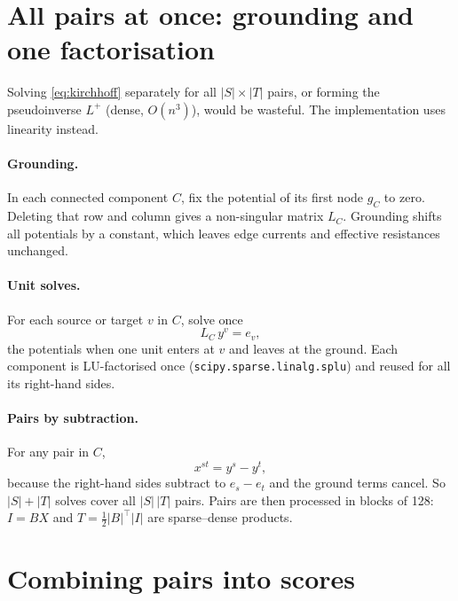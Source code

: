 \documentclass[11pt]{article}
\newcommand{\code}[1]{\texttt{#1}}
\begin{document}
\section{All pairs at once: grounding and one factorisation}

Solving \eqref{eq:kirchhoff} separately for all $|S|\times|T|$ pairs, or forming the
pseudoinverse $L^{+}$ (dense, $O(n^3)$), would be wasteful. The implementation uses
linearity instead.

\paragraph{Grounding.} In each connected component $C$, fix the potential of its
first node $g_C$ to zero. Deleting that row and column gives a non-singular matrix
$L_C$. Grounding shifts all potentials by a constant, which leaves edge currents and
effective resistances unchanged.

\paragraph{Unit solves.} For each source or target $v$ in $C$, solve once
\begin{equation}
  L_C\, y^{v} = e_v ,
  \label{eq:unit}
\end{equation}
the potentials when one unit enters at $v$ and leaves at the ground. Each component
is LU-factorised once (\code{scipy.sparse.linalg.splu}) and reused for all its
right-hand sides.

\paragraph{Pairs by subtraction.} For any pair in $C$,
\[
  x^{st} = y^{s} - y^{t},
\]
because the right-hand sides subtract to $e_s - e_t$ and the ground terms cancel.
So $|S|+|T|$ solves cover all $|S|\,|T|$ pairs. Pairs are then processed in blocks
of 128: $I = B X$ and $T=\tfrac12|B|^{\top}|I|$ are sparse--dense products.

\section{Combining pairs into scores}
\end{document}
